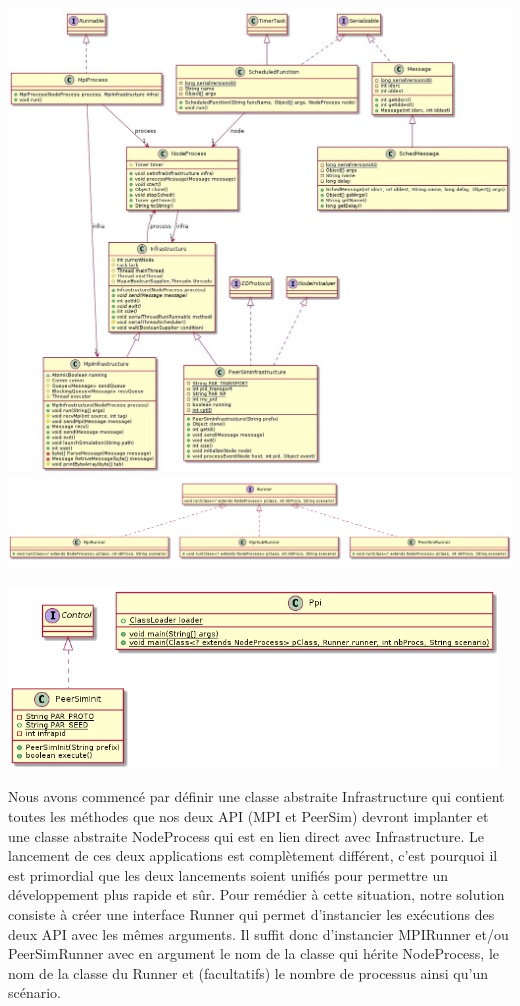 \documentclass{article}
\begin{document}
			\hspace*{-2cm} \includegraphics[width=19cm]{Ppi_uml1.jpeg}
			\hspace*{-1.8cm} \includegraphics[width=20cm]{Ppi_uml2.png}

			\newpage
			\hspace*{1cm} \includegraphics[width=13cm]{Ppi_uml3.png}

			\vspace*{3mm}

			Nous avons commencé par définir une classe abstraite Infrastructure qui contient toutes les méthodes que nos deux API (MPI et PeerSim) devront implanter et une classe abstraite NodeProcess qui est en lien direct avec Infrastructure.
			\newline
			Le lancement de ces deux applications est complètement différent, c’est pourquoi il est primordial que les deux lancements soient unifiés pour permettre un développement plus rapide et sûr. Pour remédier à cette situation, notre solution consiste à créer une interface Runner qui permet d’instancier les exécutions des deux API avec les mêmes arguments. Il suffit donc d’instancier MPIRunner et/ou PeerSimRunner avec en argument le nom de la classe qui hérite NodeProcess, le nom de la classe du Runner et (facultatifs) le nombre de processus ainsi qu’un scénario.
\end{document}
